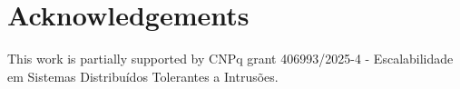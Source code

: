 \documentclass[runningheads]{llncs}
\begin{document}
\section*{Acknowledgements}

 This work is partially supported by CNPq grant 406993/2025-4 -  Escalabilidade em Sistemas Distribuídos Tolerantes a Intrusões.


%
%
%






\end{document}
